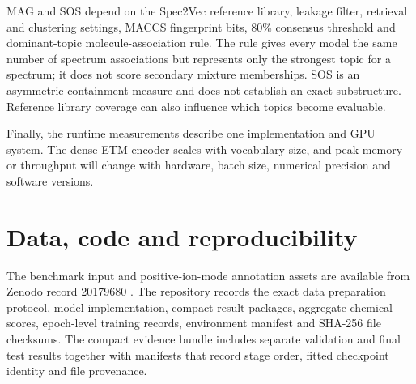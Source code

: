 \documentclass[10pt,a4paper]{article}
\begin{document}
MAG and SOS depend on the Spec2Vec reference library, leakage filter, retrieval
and clustering settings, MACCS fingerprint bits, 80\% consensus threshold and
dominant-topic molecule-association rule. The rule gives every model the same
number of spectrum associations but represents only the strongest topic for a
spectrum; it does not score secondary mixture memberships. SOS is an asymmetric
containment measure and does not establish an exact substructure. Reference
library coverage can also influence which topics become evaluable.

Finally, the runtime measurements describe one implementation and GPU system.
The dense ETM encoder scales with vocabulary size, and peak memory or throughput
will change with hardware, batch size, numerical precision and software
versions.

\section{Data, code and reproducibility}

The benchmark input and positive-ion-mode annotation assets are available from
Zenodo record 20179680 \cite{msnlibdata}. The repository records the exact data
preparation protocol, model implementation, compact result packages,
aggregate chemical scores, epoch-level training records, environment manifest and
SHA-256 file checksums. The compact evidence bundle includes separate validation
and final test results together with manifests that record stage order, fitted
checkpoint identity and file provenance.
\end{document}

